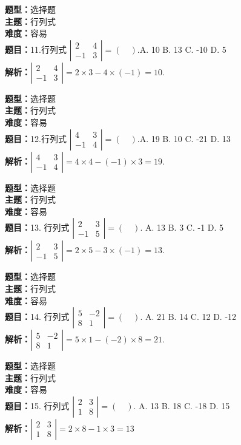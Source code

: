 \documentclass{ctexart}
\newenvironment{question}[5]{%
	\noindent\textbf{题型：}#1\\
	\textbf{主题：}#2\\
	\textbf{难度：}#3\\
	\textbf{题目：}#4\\
	\textbf{解析：}#5\\
	\vspace{1em}
}{}
\begin{document}
\begin{question}
	{选择题}
	{行列式}
	{容易}
	{11.行列式 $\left|\begin{array}{cc}2 & 4 \\ -1 & 3\end{array}\right|=(\quad). $A. 10 \quad B. 13 \quad C. -10 \quad D. 5}
	{$\left|\begin{array}{cc}2 & 4 \\ -1 & 3\end{array}\right|=2 \times 3-4 \times(-1)=10.$}
\end{question}

\begin{question}
	{选择题}
	{行列式}
	{容易}
	{12.行列式 $\left|\begin{array}{cc}4 & 3 \\ -1 & 4\end{array}\right|=(\quad). $A. 19 \quad B. 10 \quad C. -21 \quad D. 13}
	{$\left|\begin{array}{cc}4 & 3 \\ -1 & 4\end{array}\right|=4 \times 4-(-1) \times 3=19. $}
\end{question}

\begin{question}
	{选择题}
	{行列式}
	{容易}
	{13. 行列式 $\left|\begin{array}{cc}2 & 3 \\ -1 & 5\end{array}\right|=(\quad). $
		A. 13 \quad B. 3 \quad C. -1 \quad D. 5}
	{$\left|\begin{array}{cc}2 & 3 \\ -1 & 5\end{array}\right|=2 \times 5-3 \times(-1)=13. $}
\end{question}


\begin{question}
	{选择题}
	{行列式}
	{容易}
	{14. 行列式 $\left|\begin{array}{cc}5 & -2 \\ 8 & 1\end{array}\right|=(\quad). $ A.  21 \quad B.  14 \quad C.  12 \quad D. -12}
	{$\left|\begin{array}{cc}5 & -2 \\ 8 & 1\end{array}\right|=5 \times 1-(-2) \times 8=21. $}
\end{question}

\begin{question}
	{选择题}
	{行列式}
	{容易}
	{15. 行列式 $\left|\begin{array}{ll}2 & 3 \\ 1 & 8\end{array}\right|=(\quad). $ A.  13 \quad B.  18 \quad C. -18 \quad D.  15}
	{$\left|\begin{array}{ll}2 & 3 \\ 1 & 8\end{array}\right|=2 \times 8-1 \times 3=13$}
\end{question}
\end{document}
